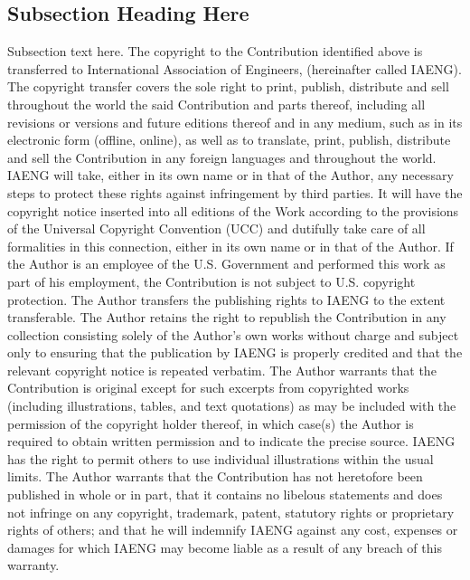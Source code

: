 \documentclass[journal]{IAENGtran}
\begin{document}

\subsection{Subsection Heading Here}
Subsection text here. The copyright to the Contribution identified
above is transferred to International Association of Engineers,
(hereinafter called IAENG). The copyright transfer covers the sole
right to print, publish, distribute and sell throughout the world
the said Contribution and parts thereof, including all revisions or
versions and future editions thereof and in any medium, such as in
its electronic form (offline, online), as well as to translate,
print, publish, distribute and sell the Contribution in any foreign
languages and throughout the world. IAENG will take, either in its
own name or in that of the Author, any necessary steps to protect
these rights against infringement by third parties. It will have the
copyright notice inserted into all editions of the Work according to
the provisions of the Universal Copyright Convention (UCC) and
dutifully take care of all formalities in this connection, either in
its own name or in that of the Author. If the Author is an employee
of the U.S. Government and performed this work as part of his
employment, the Contribution is not subject to U.S. copyright
protection. The Author transfers the publishing rights to IAENG to
the extent transferable. The Author retains the right to republish
the Contribution in any collection consisting solely of the Author's
own works without charge and subject only to ensuring that the
publication by IAENG is properly credited and that the relevant
copyright notice is repeated verbatim. The Author warrants that the
Contribution is original except for such excerpts from copyrighted
works (including illustrations, tables, and text quotations) as may
be included with the permission of the copyright holder thereof, in
which case(s) the Author is required to obtain written permission
and to indicate the precise source. IAENG has the right to permit
others to use individual illustrations within the usual limits. The
Author warrants that the Contribution has not heretofore been
published in whole or in part, that it contains no libelous
statements and does not infringe on any copyright, trademark,
patent, statutory rights or proprietary rights of others; and that
he will indemnify IAENG against any cost, expenses or damages for
which IAENG may become liable as a result of any breach of this
warranty.
\end{document}
